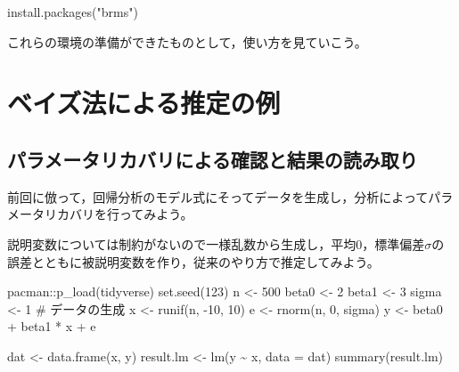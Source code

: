 \documentclass[
  a4paper,
]{ltjsbook}
\newenvironment{Shaded}{\begin{snugshade}}{\end{snugshade}}
\newcommand{\AttributeTok}[1]{\textcolor[rgb]{0.40,0.45,0.13}{#1}}
\newcommand{\CommentTok}[1]{\textcolor[rgb]{0.37,0.37,0.37}{#1}}
\newcommand{\DecValTok}[1]{\textcolor[rgb]{0.68,0.00,0.00}{#1}}
\newcommand{\FunctionTok}[1]{\textcolor[rgb]{0.28,0.35,0.67}{#1}}
\newcommand{\NormalTok}[1]{\textcolor[rgb]{0.00,0.23,0.31}{#1}}
\newcommand{\OtherTok}[1]{\textcolor[rgb]{0.00,0.23,0.31}{#1}}
\newcommand{\SpecialCharTok}[1]{\textcolor[rgb]{0.37,0.37,0.37}{#1}}
\newcommand{\StringTok}[1]{\textcolor[rgb]{0.13,0.47,0.30}{#1}}
\begin{document}
\begin{Shaded}
\begin{Highlighting}[]
\FunctionTok{install.packages}\NormalTok{(}\StringTok{"brms"}\NormalTok{)}
\end{Highlighting}
\end{Shaded}

これらの環境の準備ができたものとして，使い方を見ていこう。

\section{ベイズ法による推定の例}\label{ux30d9ux30a4ux30baux6cd5ux306bux3088ux308bux63a8ux5b9aux306eux4f8b}

\subsection{パラメータリカバリによる確認と結果の読み取り}\label{ux30d1ux30e9ux30e1ux30fcux30bfux30eaux30abux30d0ux30eaux306bux3088ux308bux78baux8a8dux3068ux7d50ux679cux306eux8aadux307fux53d6ux308a}

前回に倣って，回帰分析のモデル式にそってデータを生成し，分析によってパラメータリカバリを行ってみよう。

説明変数については制約がないので一様乱数から生成し，平均0，標準偏差\(\sigma\)の誤差とともに被説明変数を作り，従来のやり方で推定してみよう。

\begin{Shaded}
\begin{Highlighting}[]
\NormalTok{pacman}\SpecialCharTok{::}\FunctionTok{p\_load}\NormalTok{(tidyverse)}
\FunctionTok{set.seed}\NormalTok{(}\DecValTok{123}\NormalTok{)}
\NormalTok{n }\OtherTok{\textless{}{-}} \DecValTok{500}
\NormalTok{beta0 }\OtherTok{\textless{}{-}} \DecValTok{2}
\NormalTok{beta1 }\OtherTok{\textless{}{-}} \DecValTok{3}
\NormalTok{sigma }\OtherTok{\textless{}{-}} \DecValTok{1}
\CommentTok{\# データの生成}
\NormalTok{x }\OtherTok{\textless{}{-}} \FunctionTok{runif}\NormalTok{(n, }\SpecialCharTok{{-}}\DecValTok{10}\NormalTok{, }\DecValTok{10}\NormalTok{)}
\NormalTok{e }\OtherTok{\textless{}{-}} \FunctionTok{rnorm}\NormalTok{(n, }\DecValTok{0}\NormalTok{, sigma)}
\NormalTok{y }\OtherTok{\textless{}{-}}\NormalTok{ beta0 }\SpecialCharTok{+}\NormalTok{ beta1 }\SpecialCharTok{*}\NormalTok{ x }\SpecialCharTok{+}\NormalTok{ e}

\NormalTok{dat }\OtherTok{\textless{}{-}} \FunctionTok{data.frame}\NormalTok{(x, y)}
\NormalTok{result.lm }\OtherTok{\textless{}{-}} \FunctionTok{lm}\NormalTok{(y }\SpecialCharTok{\textasciitilde{}}\NormalTok{ x, }\AttributeTok{data =}\NormalTok{ dat)}
\FunctionTok{summary}\NormalTok{(result.lm)}
\end{Highlighting}
\end{Shaded}
\end{document}

